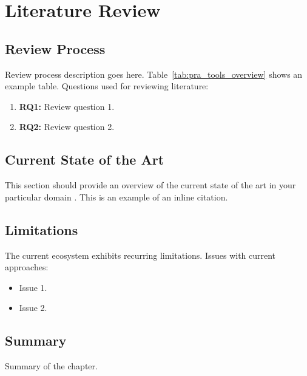 \chapter{Literature Review}
\label{chap:literature-review}


\section{Review Process}
\label{sec:lr-process}
Review process description goes here. Table~\ref{tab:pra_tools_overview} shows an example table. Questions used for reviewing literature:

\begin{enumerate}
  \item \textbf{RQ1:} Review question 1.

  \item \textbf{RQ2:} Review question 2.
\end{enumerate}


\section{Current State of the Art}
\label{sec:lr-current-state}
This section should provide an overview of the current state of the art in your particular domain \cite{saphire_8, saphire_809}. This is an example of an inline citation.




\section{Limitations}
\label{sec:lr-limitations}
The current ecosystem exhibits recurring limitations. Issues with current approaches:

\begin{itemize}
  \item Issue 1.

  \item Issue 2.
\end{itemize}


\section{Summary}
\label{sec:lr-summary}
Summary of the chapter.
